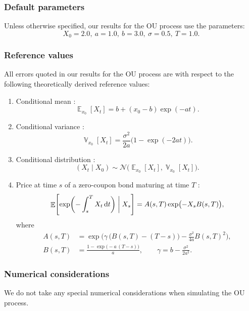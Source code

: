 \documentclass[11pt, letterpaper]{article}
\theoremstyle{definition}
\theoremstyle{remark}
\DeclareMathOperator{\E}{\mathbb{E}}
\DeclareMathOperator{\V}{\mathbb{V}}
\newcommand{\NN}{\mathcal{N}}
\newcommand{\diff}{\mathop{}\!\mathrm{d}}
\begin{document}
\begin{appendices}
\subsubsection*{Default parameters}
Unless otherwise specified, our results for the OU process use the parameters:
\[X_{0}=2.0,\ a=1.0,\ b=3.0,\ \sigma=0.5,\ T = 1.0.\]

\subsubsection*{Reference values}
All errors quoted in our results for the OU process are with respect to the following theoretically derived reference values:

\begin{enumerate}
    \item Conditional mean \cite{ornstein1930}: \begin{equation}
       \E_{x_0}[X_t] = b + (x_0 - b)\exp(-a t).
    \end{equation}
    \item Conditional variance \cite{ornstein1930}: \begin{equation}
        \V_{x_0}[X_t] = \frac{\sigma^2}{2a} \bigl( 1 - \exp(-2a t)\bigr).
    \end{equation}
    \item Conditional distribution \cite{ornstein1930}:
    \begin{equation}
        (X_t \mid X_0) \sim \NN\bigl(\E_{x_0}[X_t], \V_{x_0}[X_t]\bigr).
    \end{equation}
    \item Price at time $s$ of a zero-coupon bond maturing at time $T$ \cite{vasicek1977}: \begin{equation}
        \E\Biggl[\exp\biggl(-\int_s^T X_t \diff t\biggr)\biggm| X_s\Biggr] = A(s, T) \exp\bigl(-X_s B(s, T)\bigr),
    \end{equation}
    where
    \begin{align*}
        A(s, T) &= \exp\biggl(\gamma\, \bigl(B(s, T) - (T - s)\bigr) - \frac{\sigma^2}{4a} B(s, T)^2\biggr),\\[3pt]
        B(s, T) &= \frac{1 - \exp\bigl(-a\,(T - s)\bigr)}{a},\qquad
        \gamma = b - \frac{\sigma^2}{2a^2}.
    \end{align*}
\end{enumerate}

\subsubsection*{Numerical considerations}
We do not take any special numerical considerations when simulating the OU process.


\end{appendices}
\end{document}

